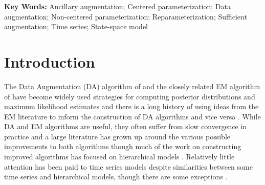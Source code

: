 \documentclass[12pt]{article}
\begin{document}
\noindent%
{\bf Key Words:} Ancillary augmentation; Centered parameterization; Data augmentation; Non-centered parameterization; Reparameterization; Sufficient augmentation; Time series; State-space model


\section{Introduction}

The Data Augmentation (DA) algorithm of \citet{tanner1987calculation} and the closely related EM algorithm of \citet{dempster1977maximum} have become widely used strategies for computing posterior distributions and maximum likelihood estimates and there is a long history of using ideas from the EM literature to inform the construction of DA algorithms and vice versa \citep{meng1997algorithm,van2010cross}. While DA and EM algorithms are useful, they often suffer from slow convergence in practice and a large literature has grown up around the various possible improvements to both algorithms \citep{meng1997algorithm,meng1999seeking,liu1999parameter,hobert2008theoretical,yu2011center} though much of the work on constructing improved algorithms has focused on hierarchical models \citep{gelfand1995efficient,roberts1997updating,meng1998fast,van2001art,bernardo2003non,papaspiliopoulos2007general,papaspiliopoulos2008stability}. Relatively little attention has been paid to time series models despite similarities between some time series and hierarchical models, though there are some exceptions \citep{pitt1999analytic,fruhwirth2003bayesian,fruhwirth2006auxiliary}. 
\end{document}
